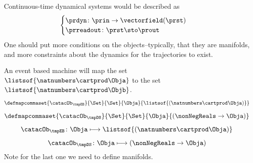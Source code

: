 {    Continuous-time dynamical systems would be described as
    \begin{equation}
        \label{eq:continuous}
        \begin{cases}
            \prdyn\colon \prin \to \vectorfield(\prst) \\
            \prreadout\colon \prst \sto \prout
        \end{cases}
    \end{equation}
    One should put more conditions on the objects--typically, that they are manifolds, and more constraints about the dynamics for the trajectories to exist.

    An event based machine will map the set~$\listsof{\natnumbers \cartprod \Obja}$ to the set~$\listsof{\natnumbers \cartprod \Objb}$.
    \begin{equation}
        \defmapcommaset{
            \catacOb_{\tmpEB}
        }{
            \Set
        }{
            \Set
        }{
            \Obja
        }{
            \listsof{(\natnumbers \cartprod \Obja)}
        }
    \end{equation}
    \begin{equation}
        \defmapcommaset{
            \catacOb_{\tmpDS}
        }{
            \Set
        }{
            \Set
        }{
            \Obja
        }{
            (\nonNegReals \to \Obja)
        }
    \end{equation}
    \begin{equation}
        \label{eq:phi-EB}
        {\catacOb_{\tmpEB}}\colon{\Obja}\longmapsto{\listsof{(\natnumbers \cartprod \Obja)}}
    \end{equation}
    \begin{equation}
        \label{eq:phi-DS}
        {\catacOb_{\tmpDS}}\colon{\Obja}\longmapsto{(\nonNegReals \to \Obja)}
    \end{equation}
    Note for the last one we need to define manifolds.

}
